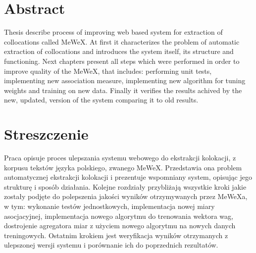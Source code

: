 \section*{Abstract}
Thesis describe process of improving web based system for extraction of
collocations called MeWeX. At first it characterizes the problem of automatic extraction of collocations 
and introduces the system itself, its structure and functioning. Next chapters present all steps 
which were performed in order to improve quality of the MeWeX, that includes: performing unit tests,
implementing new association measure, implementing new algorithm for tuning
weights and training on new data. Finally it verifies the results achived by the new, 
updated, version of the system comparing it to old results.

\vspace{5em}

\section*{Streszczenie}
Praca opisuje proces ulepszania systemu webowego do ekstrakcji kolokacji, z korpusu tekstów języka polskiego, zwanego MeWeX.
Przedstawia ona problem automatycznej ekstrakcji kolokacji i prezentuje wspomniany system, opisując jego strukturę i 
sposób działania. Kolejne rozdziały przybliżają wszystkie kroki jakie zostały podjęte do polepszenia jakości wyników 
otrzymywanych przez MeWeXa, w tym: wykonanie testów jednostkowych, implementacja nowej miary asocjacyjnej,
implementacja nowego algorytmu do trenowania wektora wag, dostrojenie agregatora miar z użyciem nowego algorytmu 
na nowych danych treningowych. Ostatnim krokiem jest weryfikacja wyników otrzymanych z ulepszonej wersji systemu 
i porównanie ich do poprzednich rezultatów.